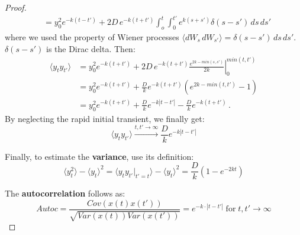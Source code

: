\begin{proof}
\begin{align*}
		&= y_0^2 e^{-k(t-t')} + 2D \, e^{-k(t+t')} \int_{o}^{t} \int_{0}^{t'} e^{k(s+s')} \delta(s-s') \, ds \, ds'
	\end{align*}
	where we used the property of Wiener processes $ \langle dW_s \, dW_{s'} \rangle = \delta(s-s') \, ds \, ds' $. $\delta(s-s')$ is the Dirac delta. Then:
	\begin{align*}
		\langle y_t y_{t'} \rangle &=  y_0^2 e^{-k(t+t')} + 2D \, e^{-k(t+t')} \left. \frac{e^{2k - min(s,s')}}{2k} \right\rvert_0^{min(t,t')}\\
		&=  y_0^2 e^{-k(t+t')} + \frac{D}{k} e^{-k(t+t')} \left( e^{2k - min(t,t') } -1  \right) \\
		&= y_0^2 e^{-k(t+t')} + \frac{D}{k}e^{-k|t-t'|} - \frac{D}{k}e^{-k(t+t')} \, .
	\end{align*}
	By neglecting the rapid initial transient, we finally get:
	\begin{equation} \label{eq:covar}
		\langle y_t y_{t'} \rangle  \xrightarrow[]{t,t' \to \infty} \frac{D}{k}e^{-k|t-t'|} 
	\end{equation}
	
	Finally, to estimate the \textbf{variance}, use its definition:
	\begin{equation} \label{eq:variance}
		\langle y_t^2 \rangle - \langle y_t \rangle ^2 = \langle y_t y_{t'} \rvert_{t'=t} \rangle -  \langle y_t \rangle ^2 = \frac{D}{k} \left( 1- e^{-2kt} \right)
	\end{equation}
	
	The \textbf{autocorrelation} follows as:
	\begin{equation} \label{eq:autoc}
		Autoc = \frac{Cov(x(t) x(t'))}{\sqrt{Var(x(t)) Var(x(t'))}} = e^{-k \cdot |t-t'|} \; \text{for} \; t,t' \to \infty
	\end{equation}
\end{proof}

